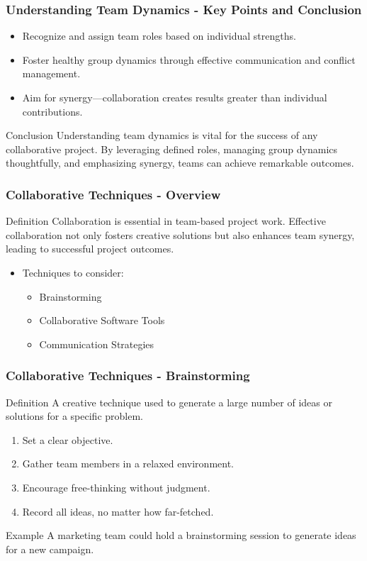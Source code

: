 \documentclass{beamer}
\begin{document}
\begin{frame}[fragile]
    \frametitle{Understanding Team Dynamics - Key Points and Conclusion}
    \begin{itemize}
        \item Recognize and assign team roles based on individual strengths.
        \item Foster healthy group dynamics through effective communication and conflict management.
        \item Aim for synergy—collaboration creates results greater than individual contributions.
    \end{itemize}
    \begin{block}{Conclusion}
        Understanding team dynamics is vital for the success of any collaborative project. By leveraging defined roles, managing group dynamics thoughtfully, and emphasizing synergy, teams can achieve remarkable outcomes.
    \end{block}
\end{frame}

\begin{frame}[fragile]
    \frametitle{Collaborative Techniques - Overview}
    \begin{block}{Definition}
        Collaboration is essential in team-based project work. Effective collaboration not only fosters creative solutions but also enhances team synergy, leading to successful project outcomes.
    \end{block}
    \begin{itemize}
        \item Techniques to consider:
        \begin{itemize}
            \item Brainstorming
            \item Collaborative Software Tools
            \item Communication Strategies
        \end{itemize}
    \end{itemize}
\end{frame}

\begin{frame}[fragile]
    \frametitle{Collaborative Techniques - Brainstorming}
    \begin{block}{Definition}
        A creative technique used to generate a large number of ideas or solutions for a specific problem.
    \end{block}
    \begin{enumerate}
        \item Set a clear objective.
        \item Gather team members in a relaxed environment.
        \item Encourage free-thinking without judgment.
        \item Record all ideas, no matter how far-fetched.
    \end{enumerate}
    \begin{block}{Example}
        A marketing team could hold a brainstorming session to generate ideas for a new campaign.
    \end{block}
\end{frame}
\end{document}
